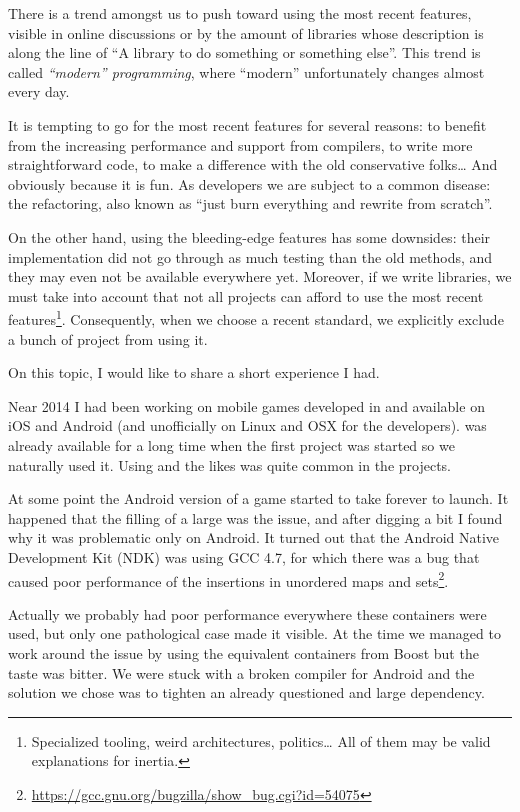 There is a trend amongst us to push toward using the most recent
features, visible in online discussions or by the amount of libraries
whose description is along the line of ``A  library to do
something or something else''. This trend is called \emph{``modern''
  \cpp{} programming}, where ``modern'' unfortunately changes almost
every day.

It is tempting to go for the most recent features for several reasons:
to benefit from the increasing performance and support from compilers,
to write more straightforward code, to make a difference with the old
conservative folks… And obviously because it is fun. As developers we
are subject to a common disease: the refactoring, also known as ``just
burn everything and rewrite from scratch''.

On the other hand, using the bleeding-edge features has some
downsides: their implementation did not go through as much testing
than the old methods, and they may even not be available everywhere
yet. Moreover, if we write libraries, we must take into account that
not all projects can afford to use the most recent
features\footnote{Specialized tooling, weird architectures, politics…
  All of them may be valid explanations for inertia.}. Consequently,
when we choose a recent standard, we explicitly exclude a bunch of
project from using it.

On this topic, I would like to share a short experience I had.

\bigskip

Near 2014 I had been working on mobile games developed in \cpp{} and
available on iOS and Android (and unofficially on Linux and OSX for
the developers).  was already available for a long time when the
first project was started so we naturally used it. Using
 and the likes was quite common in the
projects.

At some point the Android version of a game started to take forever to
launch. It happened that the filling of a large
 was the issue, and after digging a bit I
found why it was problematic only on Android. It turned out that the
Android Native Development Kit (NDK) was using GCC 4.7, for which
there was a bug that caused poor performance of the insertions in
unordered maps and
sets\footnote{\url{https://gcc.gnu.org/bugzilla/show_bug.cgi?id=54075}}.

Actually we probably had poor performance everywhere these
containers were used, but only one pathological case made it
visible. At the time we managed to work around the issue by using the
equivalent containers from Boost but the taste was bitter. We were
stuck with a broken compiler for Android and the solution we chose was
to tighten an already questioned and large dependency.


